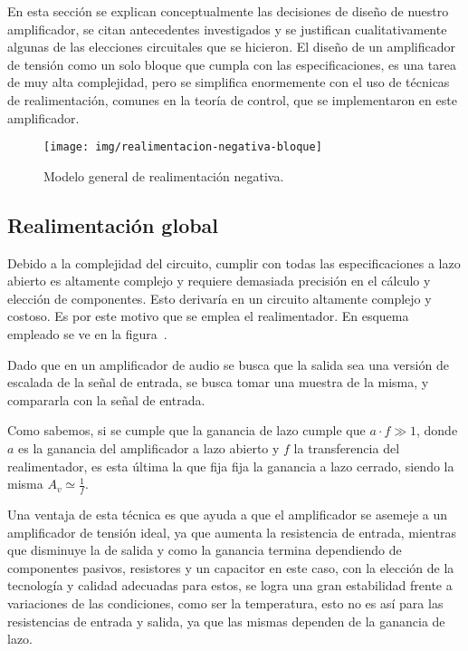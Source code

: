 En esta sección se explican conceptualmente las decisiones de diseño de nuestro amplificador, se citan antecedentes investigados y se justifican cualitativamente algunas de las elecciones circuitales que se hicieron.
El diseño de un amplificador de tensión como un solo bloque que cumpla con las especificaciones, es una tarea de muy alta complejidad, pero se simplifica enormemente con el uso de técnicas de realimentación, comunes en la teoría de control, que se implementaron en este amplificador. 

\begin{figure}[H]
	\centering
	\texttt{[image: img/realimentacion-negativa-bloque]}
	\caption{Modelo general de realimentación negativa.}
	\label{fig:ampli_feedback}
\end{figure}


\subsection{Realimentación global}


Debido a la complejidad del circuito, cumplir con todas las especificaciones a lazo abierto es altamente complejo y requiere demasiada precisión en el cálculo y elección de componentes. Esto derivaría en un circuito altamente complejo y costoso. Es por este motivo que se emplea el realimentador. En esquema empleado se ve en la figura~.

Dado que en un amplificador de audio se busca que la salida sea una versión de escalada de la señal de entrada, se busca tomar una muestra de la misma, y compararla con la señal de entrada. 

Como sabemos, si se cumple que la ganancia de lazo cumple que $a \cdot f \gg 1$, donde $a$ es la ganancia del amplificador a lazo abierto y $f$ la transferencia del realimentador, es esta última la que fija fija la ganancia a lazo cerrado, siendo la misma $A_{v} \simeq \frac{1}{f}$.

Una ventaja de esta técnica es que ayuda a que el amplificador se asemeje a un amplificador de tensión ideal, ya que aumenta la resistencia de entrada, mientras que disminuye la de salida y como la ganancia termina dependiendo de componentes pasivos, resistores y un capacitor en este caso, con la elección de la tecnología y calidad adecuadas para estos, se logra una gran estabilidad frente a variaciones de las condiciones, como ser la temperatura, esto no es así para las resistencias de entrada y salida, ya que las mismas dependen de la ganancia de lazo. 

